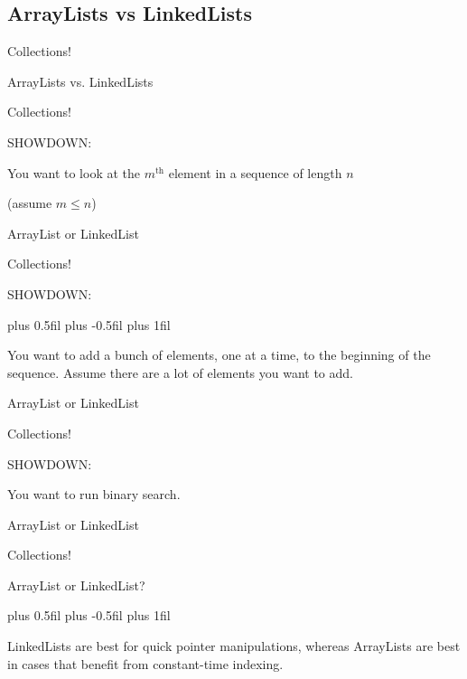 \documentclass[9pt]{beamer}
\begin{document}
\subsection{ArrayLists vs LinkedLists}

\begin{frame}[fragile]{\Huge{Collections!}}
\centerline{\Huge{ArrayLists vs. LinkedLists}}
\end{frame}

\begin{frame}[fragile]{\Huge{Collections!}}
\centerline{\huge{SHOWDOWN:} \vspace{10mm}}
\centerline{\Large{You want to look at the $m^\text{th}$ element in a sequence of length $n$}}
\centerline{\Large{ (assume $m \le n$) \vspace{5mm}}}
\centerline{\large{\alert<2>{ArrayList} or LinkedList} \vspace{5mm}}
\centerline{\large{}}
\end{frame}

\begin{frame}[fragile]{\Huge{Collections!}}
\centerline{\huge{SHOWDOWN:} \vspace{10mm}}
\begingroup
\leftskip=0cm plus 0.5fil \rightskip=0cm plus -0.5fil
\parfillskip=0cm plus 1fil
\Large{You want to add a bunch of elements, one at a time, to the beginning of the sequence. Assume there are a lot of elements you want to add. \vspace{3mm}\par}
\endgroup
\centerline{\large{ArrayList or \alert<2>{LinkedList}} \vspace{5mm}}
\centerline{\large{}}
\end{frame}

\begin{frame}[fragile]{\Huge{Collections!}}
\centerline{\huge{SHOWDOWN:} \vspace{10mm}}
\centerline{\Large You want to run binary search. \vspace{5mm}}
\centerline{\large{\alert<2>{ArrayList} or LinkedList} \vspace{5mm}}
\centerline{\large{}}
\end{frame}

\begin{frame}[fragile]{\Huge{Collections!}}
\centerline{\huge{ArrayList or LinkedList?} \vspace{10mm}}
\begingroup
\leftskip=0cm plus 0.5fil \rightskip=0cm plus -0.5fil
\parfillskip=0cm plus 1fil
\Large{LinkedLists are best for quick pointer manipulations, whereas   ArrayLists are best in cases that benefit from constant-time indexing.\par}
\endgroup
\end{frame}
\end{document}
